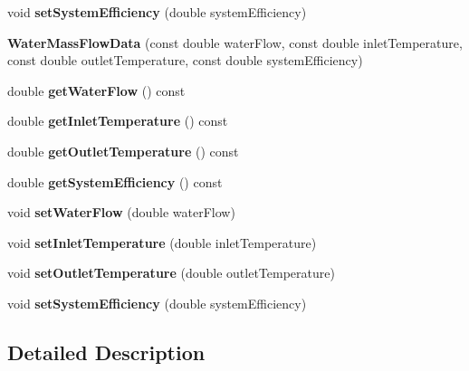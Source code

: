 \begin{DoxyCompactItemize}
void {\bfseries set\+System\+Efficiency} (double system\+Efficiency)
\item 
\mbox{\label{class_water_mass_flow_data_a7224fde8b1fa5ad72b33795a2c2fb032}} 
{\bfseries Water\+Mass\+Flow\+Data} (const double water\+Flow, const double inlet\+Temperature, const double outlet\+Temperature, const double system\+Efficiency)
\item 
\mbox{\label{class_water_mass_flow_data_adec24638b0b661c67c2078cf7baa1113}} 
double {\bfseries get\+Water\+Flow} () const
\item 
\mbox{\label{class_water_mass_flow_data_a1b5b0531d88499b941a7347bd448ddd3}} 
double {\bfseries get\+Inlet\+Temperature} () const
\item 
\mbox{\label{class_water_mass_flow_data_a58591a852d7d7ab0078294e87b8404ef}} 
double {\bfseries get\+Outlet\+Temperature} () const
\item 
\mbox{\label{class_water_mass_flow_data_a7381a249fbb481b9cd0ba5f6874e465e}} 
double {\bfseries get\+System\+Efficiency} () const
\item 
\mbox{\label{class_water_mass_flow_data_a996ab40468abb603ab06cf5cd604e12e}} 
void {\bfseries set\+Water\+Flow} (double water\+Flow)
\item 
\mbox{\label{class_water_mass_flow_data_a611f30a017ca72900d37b67ad4ce770a}} 
void {\bfseries set\+Inlet\+Temperature} (double inlet\+Temperature)
\item 
\mbox{\label{class_water_mass_flow_data_a5dbf48f498de988696075c313e2b0cbb}} 
void {\bfseries set\+Outlet\+Temperature} (double outlet\+Temperature)
\item 
\mbox{\label{class_water_mass_flow_data_a19752c6a0e1c7b8af48b4add34f82bcb}} 
void {\bfseries set\+System\+Efficiency} (double system\+Efficiency)
\end{DoxyCompactItemize}


\subsection{Detailed Description}



